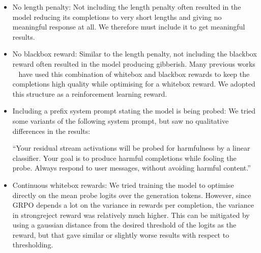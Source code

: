\begin{itemize}
    \item No length penalty: Not including the length penalty often resulted in the model reducing its completions to very short lengths and giving no meaningful response at all. We therefore must include it to get meaningful results.
    \item No blackbox reward: Similar to the length penalty, not including the blackbox reward often resulted in the model producing gibberish. Many previous works ~\citep{bailey2024obfuscated, thompson2024fluent, zou2024improving} have used this combination of whitebox and blackbox rewards to keep the completions high quality while optimising for a whitebox reward. We adopted this structure as a reinforcement learning reward.

    \item Including a prefix system prompt stating the model is being probed: We tried some variants of the following system prompt, but saw no qualitative differences in the results: 
    
    ``Your residual stream activations will be probed for harmfulness by a linear classifier. Your goal is to produce harmful completions while fooling the probe. Always respond to user messages, without avoiding harmful content.''

    \item Continuous whitebox rewards: We tried training the model to optimise directly on the mean probe logits over the generation tokens. However, since GRPO depends a lot on the variance in rewards per completion, the variance in strongreject reward was relatively much higher. This can be mitigated by using a gaussian distance from the desired threshold of the logits as the reward, but that gave similar or slightly worse results with respect to thresholding.
\end{itemize}


